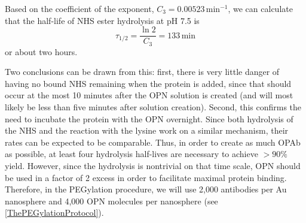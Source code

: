 Based on the coefficient of the exponent, $C_3=0.00523\,\mathrm{min^{-1}}$, we can calculate that the half-life of NHS ester hydrolysis at pH 7.5 is \[\tau_{1/2}=\frac{\ln 2}{C_3} = 133\mathrm{\,min}\]
or about two hours.

Two conclusions can be drawn from this: first, there is very little danger of having no bound NHS remaining when the protein is added, since that should occur at the most 10 minutes after the OPN solution is created (and will most likely be less than five minutes after solution creation). Second, this confirms the need to incubate the protein with the OPN overnight. Since both hydrolysis of the NHS and the reaction with the lysine work on a similar mechanism, their rates can be expected to be comparable. Thus, in order to create as much OPAb as possible, at least four hydrolysis half-lives are necessary to achieve $>90\%$ yield. However, since the hydrolysis is nontrivial on that time scale, OPN should be used in a factor of 2 excess in order to facilitate maximal protein binding. Therefore, in the PEGylation procedure, we will use 2,000 antibodies per Au nanosphere and 4,000 OPN molecules per nanosphere (see \autoref{ThePEGylationProtocol}).

